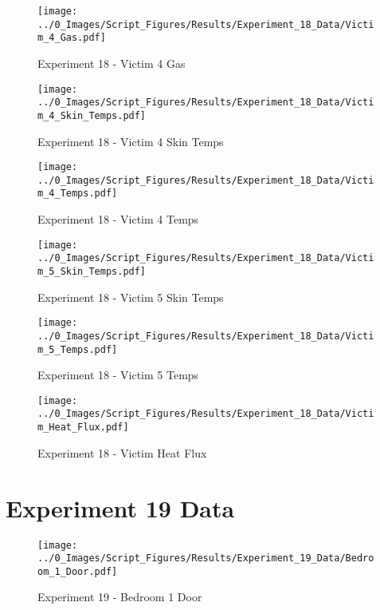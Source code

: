 	\begin{figure}[H]
		\centering
		\texttt{[image: ../0\_Images/Script\_Figures/Results/Experiment\_18\_Data/Victim\_4\_Gas.pdf]}
		\caption[]{Experiment 18 - Victim 4 Gas}
	\end{figure}
 
	\clearpage

	\begin{figure}[H]
		\centering
		\texttt{[image: ../0\_Images/Script\_Figures/Results/Experiment\_18\_Data/Victim\_4\_Skin\_Temps.pdf]}
		\caption[]{Experiment 18 - Victim 4 Skin Temps}
	\end{figure}
 

	\begin{figure}[H]
		\centering
		\texttt{[image: ../0\_Images/Script\_Figures/Results/Experiment\_18\_Data/Victim\_4\_Temps.pdf]}
		\caption[]{Experiment 18 - Victim 4 Temps}
	\end{figure}
 
	\clearpage

	\begin{figure}[H]
		\centering
		\texttt{[image: ../0\_Images/Script\_Figures/Results/Experiment\_18\_Data/Victim\_5\_Skin\_Temps.pdf]}
		\caption[]{Experiment 18 - Victim 5 Skin Temps}
	\end{figure}
 

	\begin{figure}[H]
		\centering
		\texttt{[image: ../0\_Images/Script\_Figures/Results/Experiment\_18\_Data/Victim\_5\_Temps.pdf]}
		\caption[]{Experiment 18 - Victim 5 Temps}
	\end{figure}
 
	\clearpage

	\begin{figure}[H]
		\centering
		\texttt{[image: ../0\_Images/Script\_Figures/Results/Experiment\_18\_Data/Victim\_Heat\_Flux.pdf]}
		\caption[]{Experiment 18 - Victim Heat Flux}
	\end{figure}
 

\clearpage		\large
\section{Experiment 19 Data} \label{App:Exp19Results} 

	\begin{figure}[H]
		\centering
		\texttt{[image: ../0\_Images/Script\_Figures/Results/Experiment\_19\_Data/Bedroom\_1\_Door.pdf]}
		\caption[]{Experiment 19 - Bedroom 1 Door}
	\end{figure}
 

